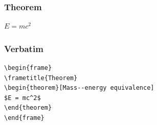 \documentclass{beamer}
\begin{document}

\begin{frame}
\frametitle{Theorem}
\begin{theorem}
$E = mc^2$
\end{theorem}
\end{frame}


\begin{frame}[fragile] %
\frametitle{Verbatim}
\begin{example}
\begin{verbatim}
\begin{frame}
\frametitle{Theorem}
\begin{theorem}[Mass--energy equivalence]
$E = mc^2$
\end{theorem}
\end{frame}\end{verbatim}
\end{example}
\end{frame}

\end{document}

